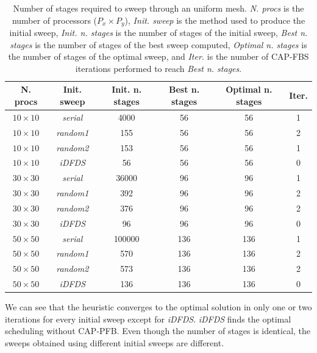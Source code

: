 \documentclass{mc2015}
\renewcommand{\(}{\left(}
\renewcommand{\)}{\right)}
\renewcommand{\[}{\left[}
\renewcommand{\]}{\right]}
\begin{document}
\begin{table}[H]
  \begin{center}
    \caption{Number of stages required to sweep through an uniform mesh.
      \emph{N. procs} is the number of processors ($P_x \times P_y$), \emph{Init. sweep} is the
      method used to produce the initial sweep, \emph{Init. n. stages} is the
      number of stages of the initial sweep, \emph{Best n. stages} is the
      number of stages of the best sweep computed, \emph{Optimal n. stages} is the
      number of stages of the optimal sweep, and \emph{Iter.} is the number
    of CAP-FBS iterations performed to reach \emph{Best n. stages}.}
    \begin{tabular}{|c|c|c|c|c|c|}
      \hline
      N. procs & Init. sweep & Init. n. stages & Best n. stages & Optimal n. stages & Iter. \\
      \hline
      $10\times 10$ & \emph{serial}  &   4000 &  56 &  56 & 1 \\
      $10\times 10$ & \emph{random1} &    155 &  56 &  56 & 2 \\
      $10\times 10$ & \emph{random2} &    153 &  56 &  56 & 1 \\
      $10\times 10$ & \emph{iDFDS}   &     56 &  56 &  56 & 0 \\
      $30\times 30$ & \emph{serial}  &  36000 &  96 &  96 & 1 \\
      $30\times 30$ & \emph{random1} &    392 &  96 &  96 & 2 \\
      $30\times 30$ & \emph{random2} &    376 &  96 &  96 & 2 \\
      $30\times 30$ & \emph{iDFDS}   &     96 &  96 &  96 & 0 \\
      $50\times 50$ & \emph{serial}  & 100000 & 136 & 136 & 1 \\
      $50\times 50$ & \emph{random1} &    570 & 136 & 136 & 2 \\ 
      $50\times 50$ & \emph{random2} &    573 & 136 & 136 & 2 \\
      $50\times 50$ & \emph{iDFDS}   &    136 & 136 & 136 & 0 \\
      \hline
    \end{tabular}
    \label{uniform}
  \end{center}
\end{table}

We can see that the heuristic converges to the optimal solution in only one or
two iterations for every initial sweep except for \emph{iDFDS}. \emph{iDFDS} 
finds the optimal scheduling without CAP-PFB. Even though the number of stages is
identical, the sweeps obtained using different initial sweeps are
different.
\end{document}
